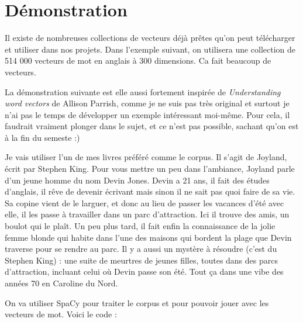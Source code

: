 \documentclass[11pt, a4paper]{report}
\begin{document}
\section*{Démonstration}
Il existe de nombreuses collections de vecteurs déjà prêtes qu'on 
peut télécharger et utiliser dans nos projets. Dans l'exemple suivant, 
on utilisera une collection de 514 000 vecteurs de mot en anglais à 300 dimensions. 
Ca fait beaucoup de vecteurs. 

La démonstration suivante est elle aussi fortement inspirée de 
\textit{Understanding word vectors} de Allison Parrish, comme je ne suis pas 
très original et surtout je n'ai pas le temps de développer un exemple intéressant 
moi-même. Pour cela, il faudrait vraiment plonger dans le sujet, et ce n'est pas 
possible, sachant qu'on est à la fin du semeste :)

Je vais utiliser l'un de mes livres préféré comme le corpus. Il s'agit de 
Joyland, écrit par Stephen King. Pour vous mettre un peu dans l'ambiance, 
Joyland parle d'un jeune homme du nom Devin Jones. Devin a 21 ans, il fait 
des études d'anglais, il rêve de devenir écrivant mais sinon il ne sait pas 
quoi faire de sa vie. Sa copine vient de le larguer, et donc au lieu de 
passer les vacances d'été avec elle, il les passe à travailler dans un parc 
d'attraction. Ici il trouve des amis, un boulot qui le plaît. Un peu plus tard, 
il fait enfin la connaissance de la jolie femme blonde qui habite dans l'une des maisons 
qui bordent la plage que Devin traverse pour se rendre au parc. Il y a aussi 
un mystère à résoudre (c'est du Stephen King) : une suite de meurtres de jeunes 
filles, toutes dans des parcs d'attraction, incluant celui où Devin passe son été. 
Tout ça dans une vibe des années 70 en Caroline du Nord. 

On va utiliser SpaCy pour traiter le corpus et pour pouvoir jouer avec les 
vecteurs de mot. Voici le code : 
\end{document}
